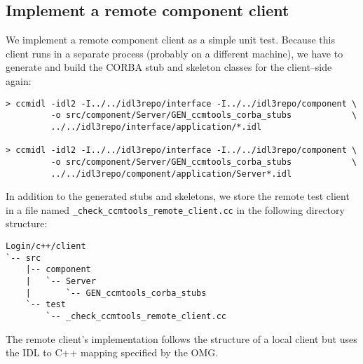 \subsection{Implement a remote component client}
\label{subsection:ImplementRemoteComponentClient}
We implement a remote component client as a simple unit test.
Because this client runs in a separate process (probably on a different machine), we
have to generate and build the CORBA stub and skeleton classes for the client--side 
again:
\begin{footnotesize}
\begin{verbatim}
> ccmidl -idl2 -I../../idl3repo/interface -I../../idl3repo/component \
         -o src/component/Server/GEN_ccmtools_corba_stubs            \  
         ../../idl3repo/interface/application/*.idl

> ccmidl -idl2 -I../../idl3repo/interface -I../../idl3repo/component \
         -o src/component/Server/GEN_ccmtools_corba_stubs            \
         ../../idl3repo/component/application/Server*.idl
\end{verbatim}
\end{footnotesize}

In addition to the generated stubs and skeletons, we store the remote test
client in a file named {\tt \_check\_ccmtools\_remote\_client.cc} in the 
following directory structure:
\begin{footnotesize}
\begin{verbatim}
Login/c++/client
`-- src
    |-- component
    |   `-- Server
    |       `-- GEN_ccmtools_corba_stubs
    `-- test
        `-- _check_ccmtools_remote_client.cc
\end{verbatim}
\end{footnotesize}

The remote client's implementation follows the structure of a local client but
uses the IDL to C++ mapping specified by the OMG.

